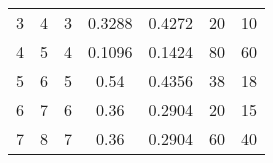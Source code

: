 \begin{table}
\begin{adjustbox}{width=1.2\textwidth,center=\textwidth}
\begin{tabular}{ccccccc}
3                                                         & 4                                                           & 3                                                   & 0.3288                                                                     & 0.4272                                                                    & 20                                                                          & 10                                                                               \\
4                                                         & 5                                                           & 4                                                   & 0.1096                                                                     & 0.1424                                                                    & 80                                                                          & 60                                                                               \\
5                                                         & 6                                                           & 5                                                   & 0.54                                                                       & 0.4356                                                                    & 38                                                                          & 18                                                                               \\
6                                                         & 7                                                           & 6                                                   & 0.36                                                                       & 0.2904                                                                    & 20                                                                          & 15                                                                               \\
7                                                         & 8                                                           & 7                                                   & 0.36                                                                       & 0.2904                                                                    & 60                                                                          & 40                                                                               \\

\end{tabular}
\end{adjustbox}
\end{table}
